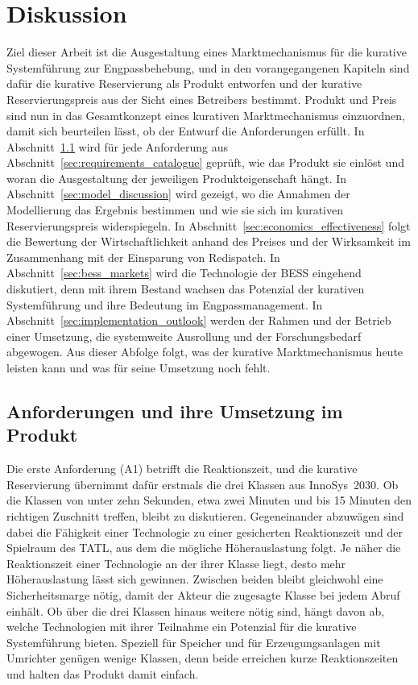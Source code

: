 \chapter{Diskussion}
\label{ch:discussion}

Ziel dieser Arbeit ist die Ausgestaltung eines Marktmechanismus für die kurative Systemführung zur Engpassbehebung, und in den vorangegangenen Kapiteln sind dafür die kurative Reservierung als Produkt entworfen und der kurative Reservierungspreis aus der Sicht eines Betreibers bestimmt.
Produkt und Preis sind nun in das Gesamtkonzept eines kurativen Marktmechanismus einzuordnen, damit sich beurteilen lässt, ob der Entwurf die Anforderungen erfüllt.
In Abschnitt~\ref{sec:requirements_assessment} wird für jede Anforderung aus Abschnitt~\ref{sec:requirements_catalogue} geprüft, wie das Produkt sie einlöst und woran die Ausgestaltung der jeweiligen Produkteigenschaft hängt.
In Abschnitt~\ref{sec:model_discussion} wird gezeigt, wo die Annahmen der Modellierung das Ergebnis bestimmen und wie sie sich im kurativen Reservierungspreis widerspiegeln.
In Abschnitt~\ref{sec:economics_effectiveness} folgt die Bewertung der Wirtschaftlichkeit anhand des Preises und der Wirksamkeit im Zusammenhang mit der Einsparung von Redispatch.
In Abschnitt~\ref{sec:bess_markets} wird die Technologie der \ac{BESS} eingehend diskutiert, denn mit ihrem Bestand wachsen das Potenzial der kurativen Systemführung und ihre Bedeutung im Engpassmanagement.
In Abschnitt~\ref{sec:implementation_outlook} werden der Rahmen und der Betrieb einer Umsetzung, die systemweite Ausrollung und der Forschungsbedarf abgewogen.
Aus dieser Abfolge folgt, was der kurative Marktmechanismus heute leisten kann und was für seine Umsetzung noch fehlt.

\section{Anforderungen und ihre Umsetzung im Produkt}
\label{sec:requirements_assessment}

Die erste Anforderung (A1) betrifft die Reaktionszeit, und die kurative Reservierung übernimmt dafür erstmals die drei Klassen aus InnoSys~2030.
Ob die Klassen von unter zehn Sekunden, etwa zwei Minuten und bis 15 Minuten den richtigen Zuschnitt treffen, bleibt zu diskutieren.
Gegeneinander abzuwägen sind dabei die Fähigkeit einer Technologie zu einer gesicherten Reaktionszeit und der Spielraum des \ac{TATL}, aus dem die mögliche Höherauslastung folgt.
Je näher die Reaktionszeit einer Technologie an der ihrer Klasse liegt, desto mehr Höherauslastung lässt sich gewinnen.
Zwischen beiden bleibt gleichwohl eine Sicherheitsmarge nötig, damit der Akteur die zugesagte Klasse bei jedem Abruf einhält.
Ob über die drei Klassen hinaus weitere nötig sind, hängt davon ab, welche Technologien mit ihrer Teilnahme ein Potenzial für die kurative Systemführung bieten.
Speziell für Speicher und für Erzeugungsanlagen mit Umrichter genügen wenige Klassen, denn beide erreichen kurze Reaktionszeiten und halten das Produkt damit einfach.

